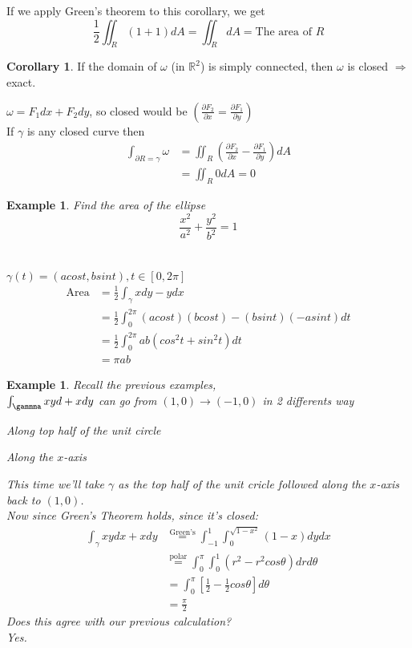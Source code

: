 \documentclass[12pt]{article}
\theoremstyle{plain}
\newtheorem{example}[theorem]{Example}
\theoremstyle{definition}
\newtheorem{corollary}[theorem]{Corollary}
\begin{document}
	If we apply Green's theorem to this corollary, we get
	$$\frac{1}{2} \iint_R (1+1) dA = \iint_R dA = \text{The area of $R$}$$

	\begin{corollary}
		If the domain of $\omega$ (in $\mathbb{R}^2$) is simply connected, then $\omega$ is closed $\Longrightarrow$ exact.
	\end{corollary}

	$\omega = F_1 dx + F_2 dy$, so closed would be $(\frac{\partial F_2}{\partial x} = \frac{\partial F_1}{\partial y})$\\
	If $\gamma$ is any closed curve then
	\begin{align*}
		\int_{\partial R = \gamma} \omega &= \iint_R (\frac{\partial F_2}{\partial x} - \frac{\partial F_1}{\partial y}) dA\\
		&= \iint_R 0 dA = 0
	\end{align*}

	\begin{example}
		Find the area of the ellipse
		$$\frac{x^2}{a^2} + \frac{y^2}{b^2} = 1$$\\
		\\
		$\gamma (t) = (acost, bsint), t\in [0,2\pi]$
		\begin{align*}
			\text{Area} &= \frac{1}{2} \int_\gamma xdy-ydx\\
			&= \frac{1}{2} \int^{2\pi}_0 (acost)(bcost)-(bsint)(-asint)dt\\
			&= \frac{1}{2} \int^{2\pi}_0 ab (cos^2 t + sin^2 t)dt\\
			&= \pi ab
		\end{align*}
	\end{example}

	\begin{example}
		Recall the previous examples,\\
		$\int_\gammma xyd + xdy$ can go from $(1,0)\to (-1,0)$ in 2 differents way\\
		\begin{enu}
			\item{Along top half of the unit circle}
			\item{Along the $x$-axis}
		\end{enu}
		This time we'll take $\gamma$ as the top half of the unit cricle followed along the $x$-axis back to $(1,0)$.\\
		Now since Green's Theorem holds, since it's closed:
		\begin{align*}
			\int_\gamma xydx + xdy &\overset{\text{Green's}}{=} \int^1_{-1} \int_0^{\sqrt{1-x^2}} (1-x) dydx\\
			&\overset{\text{polar}}{=} \int^\pi_0 \int^1_0 (r^2 - r^2 cos\theta) dr d\theta\\
			&= \int^\pi_0 [\frac{1}{2} - \frac{1}{2} cos\theta]d\theta\\
			&= \frac{\pi}{2}
		\end{align*}
		Does this agree with our previous calculation?\\
		Yes.
	\end{example}
\end{document}
